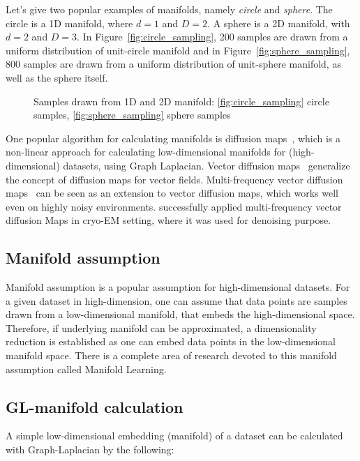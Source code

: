 Let's give two popular examples of manifolds, namely \textit{circle} and \textit{sphere}.
The circle is a 1D manifold, where $d=1$ and $D=2$. A sphere is a 2D manifold, with $d=2$ and $D=3$.
In Figure~\ref{fig:circle_sampling}, 200 samples are drawn from a uniform distribution of unit-circle manifold
and in Figure~\ref{fig:sphere_sampling}, 800 samples are drawn from a uniform distribution of unit-sphere manifold,
as well as the sphere itself.

\begin{figure}[H]
    \hfill
    \hfill
    \hfill
        \caption{Samples drawn from 1D and 2D manifold: 
    \ref{fig:circle_sampling} circle samples,
    \ref{fig:sphere_sampling} sphere samples}
\end{figure}

One popular algorithm for calculating manifolds is diffusion maps~\cite{diffusionMaps}, 
which is a non-linear approach for calculating low-dimensional manifolds
for (high-dimensional) datasets, using Graph Laplacian.
Vector diffusion maps~\cite{vectorDiffusionMaps} generalize the concept of diffusion maps for vector fields.
Multi-frequency vector diffusion maps~\cite{multiDiffusionMaps} 
can be seen as an extension to vector diffusion maps, which works well even on highly noisy environments.
\citet{cryoEmMutliDM} successfully applied multi-frequency vector diffusion Maps in cryo-EM setting,
 where it was used for denoising purpose.

\subsection{Manifold assumption}
\label{sec:manifoldAssumption}
Manifold assumption is a popular assumption for high-dimensional datasets.
For a given dataset in high-dimension, one can assume that data points are samples drawn from a low-dimensional manifold,
that embeds the high-dimensional space. 
Therefore, if underlying manifold can be approximated, a dimensionality reduction
is established as one can embed data points in the low-dimensional manifold space.
There is a complete area of research devoted to this manifold assumption called Manifold Learning\cite{ManifoldLearning}.

\subsection{GL-manifold calculation}
\label{sec:manifold_calculation}
A simple low-dimensional embedding (manifold) of a dataset can be calculated with Graph-Laplacian 
by the following:

